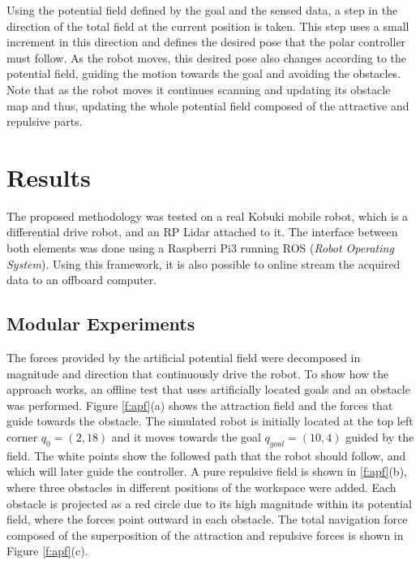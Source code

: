 \documentclass[conference]{IEEEtran}
\begin{document}
Using the potential field defined by the goal and the sensed data, a step in
the direction of the total field at the current position is taken. This step
uses a small increment in this direction and defines the desired pose that the
polar controller must follow. As the robot moves, this desired pose also
changes according to the potential field, guiding the motion towards the goal
and avoiding the obstacles. Note that as the robot moves it continues scanning
and updating its obstacle map and thus, updating the whole potential field
composed of the attractive and repulsive parts.  


\section{Results}

The proposed methodology was tested on a real Kobuki mobile robot, which is a
differential drive robot, and an RP Lidar attached to it. The interface between
both elements was done using a Raspberri Pi3 running ROS (\textit{Robot
  Operating System}). Using this framework, it is also possible to online
stream the acquired data to an offboard computer.

\subsection{Modular Experiments}

The forces provided by the artificial potential field were decomposed in
magnitude and direction that continuously drive the robot. To show how the
approach works, an offline test that uses artificially located goals and an
obstacle was performed. Figure \ref{f:apf}(a) shows the attraction field and
the forces that guide towards the obstacle. The simulated robot is initially
located at the top left corner $q_0=(2,18)$ and it moves towards the goal
$q_{goal}=(10,4)$ guided by the field. The white points show the followed path
that the robot should follow, and which will later guide the controller. A pure
repulsive field is shown in \ref{f:apf}(b), where three obstacles in different
positions of the workspace were added. Each obstacle is projected as a red
circle due to its high magnitude within its potential field, where the forces
point outward in each obstacle. The total navigation force composed of the
superposition of the attraction and repulsive forces is shown in Figure
\ref{f:apf}(c).
\end{document}
